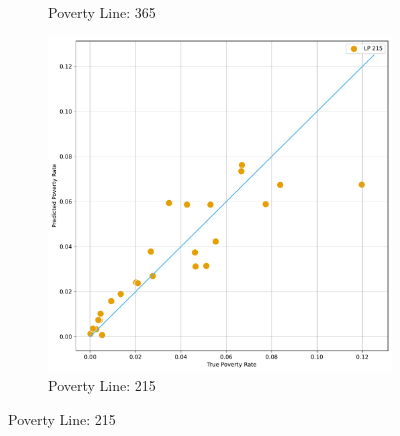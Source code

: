 \begin{figure}[H]
\begin{subfigure}[b]{0.47\textwidth}
             \caption{Poverty Line: 365}
         \end{subfigure} 
          \hfill
         \begin{subfigure}[b]{0.47\textwidth}
             \centering
             \includegraphics[width=\textwidth]{../figures/fig4_2_prediction_vs_true_poverty_rate_regions_p215_scatter.pdf}
             \caption{Poverty Line: 215}
         \end{subfigure} 
    \end{figure}



